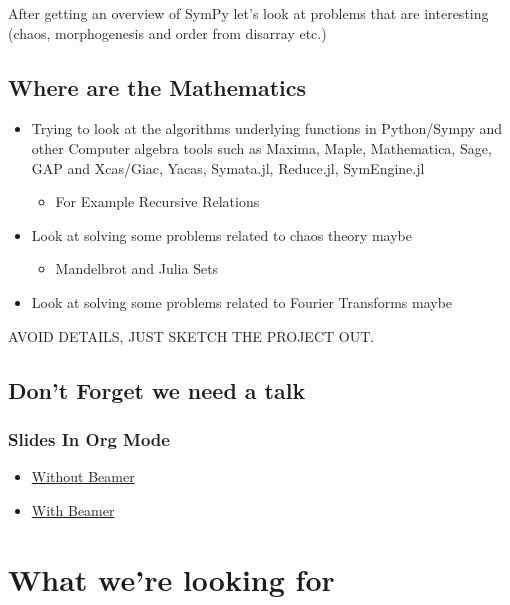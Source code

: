 \documentclass[11pt]{article}
\begin{document}
After getting an overview of SymPy let's look at problems that are interesting (chaos, morphogenesis and order from disarray etc.)


\subsection{Where are the Mathematics}
\label{sec:org1c71f22}

\begin{itemize}
\item Trying to look at the algorithms underlying functions in Python/Sympy and other Computer algebra tools such as Maxima, Maple, Mathematica, Sage, GAP and Xcas/Giac, Yacas, Symata.jl, Reduce.jl, SymEngine.jl
\begin{itemize}
\item For Example Recursive Relations
\end{itemize}
\item Look at solving some problems related to chaos theory maybe
\begin{itemize}
\item Mandelbrot and Julia Sets
\end{itemize}
\item Look at solving some problems related to Fourier Transforms maybe
\end{itemize}


AVOID DETAILS, JUST SKETCH THE PROJECT OUT.


\subsection{Don't Forget we need a talk}
\label{sec:org93e3d04}
\subsubsection{Slides In Org Mode}
\label{sec:org4921905}
\begin{itemize}
\item \href{https://orgmode.org/worg/org-tutorials/non-beamer-presentations.html}{Without Beamer}
\item \href{https://orgmode.org/worg/exporters/beamer/tutorial.html}{With Beamer}
\end{itemize}

\section{What we're looking for}
\label{sec:org2be1b18}
\end{document}
